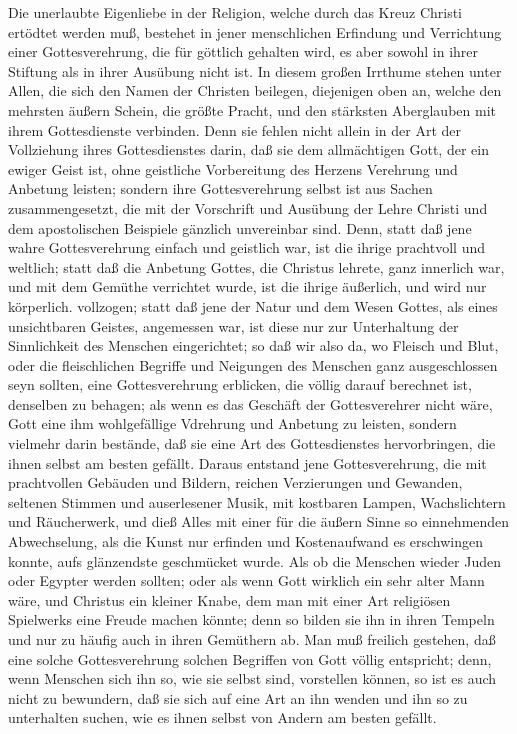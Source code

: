Die unerlaubte Eigenliebe in der Religion, welche durch das Kreuz Christi
ertödtet werden muß, bestehet in jener menschlichen Erfindung und Verrichtung
einer Gottesverehrung, die für göttlich gehalten wird, es aber sowohl in ihrer
Stiftung als in ihrer Ausübung nicht ist. In diesem großen Irrthume stehen unter
Allen, die sich den Namen der Christen beilegen, diejenigen oben an, welche den
mehrsten äußern Schein, die größte Pracht, und den stärksten Aberglauben mit
ihrem Gottesdienste verbinden. Denn sie fehlen nicht allein in der Art der
Vollziehung ihres Gottesdienstes darin, daß sie dem allmächtigen Gott, der ein
ewiger Geist ist, ohne geistliche Vorbereitung des Herzens Verehrung und
Anbetung leisten; sondern ihre Gottesverehrung selbst ist aus Sachen
zusammengesetzt, die mit der Vorschrift und Ausübung der Lehre Christi und dem
apostolischen Beispiele gänzlich unvereinbar sind. Denn, statt daß jene wahre
Gottesverehrung einfach und geistlich war, ist die ihrige prachtvoll und
weltlich; statt daß die Anbetung Gottes, die Christus lehrete, ganz innerlich
war, und mit dem Gemüthe verrichtet wurde, ist die ihrige äußerlich, und wird
nur körperlich. vollzogen; statt daß jene der Natur und dem Wesen Gottes, als
eines unsichtbaren Geistes, angemessen war, ist diese nur zur Unterhaltung der
Sinnlichkeit des Menschen eingerichtet; so daß wir also da, wo Fleisch und Blut,
oder die fleischlichen Begriffe und Neigungen des Menschen ganz ausgeschlossen
seyn sollten, eine Gottesverehrung erblicken, die völlig darauf berechnet ist,
denselben zu behagen; als wenn es das Geschäft der Gottesverehrer nicht wäre,
Gott eine ihm wohlgefällige Vdrehrung und Anbetung zu leisten, sondern vielmehr
darin bestände, daß sie eine Art des Gottesdienstes hervorbringen, die ihnen
selbst am besten gefällt. Daraus entstand jene Gottesverehrung, die mit
prachtvollen Gebäuden und Bildern, reichen Verzierungen und Gewanden, seltenen
Stimmen und auserlesener Musik, mit kostbaren Lampen, Wachslichtern und
Räucherwerk, und dieß Alles mit einer für die äußern Sinne so einnehmenden
Abwechselung, als die Kunst nur erfinden und Kostenaufwand es erschwingen
konnte, aufs glänzendste geschmücket wurde. Als ob die Menschen wieder Juden
oder Egypter werden sollten; oder als wenn Gott wirklich ein sehr alter Mann
wäre, und Christus ein kleiner Knabe, dem man mit einer Art religiösen
Spielwerks eine Freude machen könnte; denn so bilden sie ihn in ihren Tempeln
und nur zu häufig auch in ihren Gemüthern ab. Man muß freilich gestehen, daß
eine solche Gottesverehrung solchen Begriffen von Gott völlig entspricht; denn,
wenn Menschen sich ihn so, wie sie selbst sind, vorstellen können, so ist es
auch nicht zu  bewundern, daß sie sich auf eine Art an ihn wenden und ihn so zu
unterhalten suchen, wie es ihnen selbst von Andern am besten gefällt.

